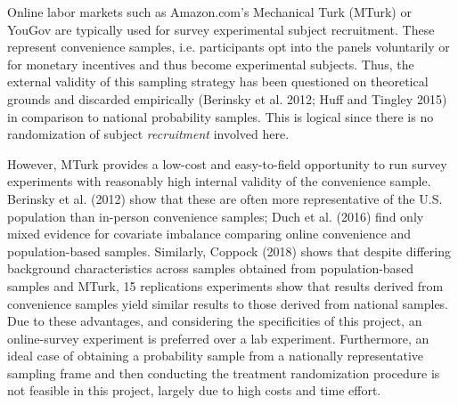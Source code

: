 \documentclass[11pt]{article}
\begin{document}
Online labor markets such as Amazon.com's Mechanical Turk (MTurk) or YouGov are typically used for survey experimental subject recruitment. These represent convenience samples, i.e. participants opt into the panels voluntarily or for monetary incentives and thus become experimental subjects. Thus, the external validity of this sampling strategy has been questioned on theoretical grounds and discarded empirically (Berinsky et al. 2012; Huff and Tingley 2015) in comparison to national probability samples. This is logical since there is no randomization of subject \textit{recruitment} involved here.

However, MTurk provides a low-cost and easy-to-field opportunity to run survey experiments with reasonably high internal validity of the convenience sample. Berinsky et al. (2012) show that these are often more representative of the U.S. population than in-person convenience samples; Duch et al. (2016) find only mixed evidence for covariate imbalance comparing online convenience and population-based samples. Similarly, Coppock (2018) shows that despite differing background characteristics across samples obtained from population-based samples and MTurk, 15 replications experiments show that results derived from convenience samples yield similar results to those derived from national samples. Due to these advantages, and considering the specificities of this project, an online-survey experiment is preferred over a lab experiment. Furthermore, an ideal case of obtaining a probability sample from a nationally representative sampling frame and then conducting the treatment randomization procedure is not feasible in this project, largely due to high costs and time effort.
\end{document}
